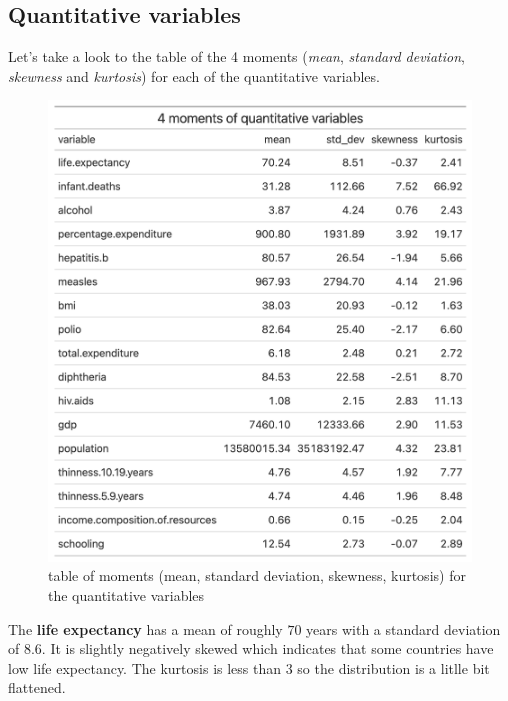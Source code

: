 \subsection{Quantitative variables}

Let's take a look to the table of the 4 moments (\textit{mean}, \textit{standard deviation}, \textit{skewness} and \textit{kurtosis}) for each of the quantitative variables. 

\begin{figure}[H]
	\centering
	\includegraphics{figures/quantitative_variables_moments.png}
	\caption{table of moments (mean, standard deviation, skewness, kurtosis) for the quantitative variables}
	\label{fig:quantitative_variables_moments}
\end{figure}

The \textbf{life expectancy} has a mean of roughly $70$ years with a standard deviation of $8.6$. It is slightly negatively skewed which indicates that some countries have low life expectancy. The kurtosis is less than $3$ so the distribution is a litlle bit flattened.

